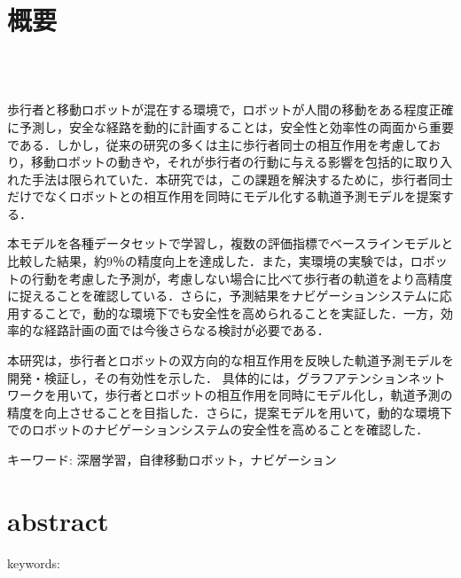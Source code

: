 \chapter*{概要}
\thispagestyle{empty}
%
\begin{center}
  \scalebox{1.5}{移動ロボットのための深層学習を用いた}\\
  \scalebox{1.5}{歩行者の位置予測とナビゲーションへの応用}\\
\end{center}
\vspace{1.0zh}
%

歩行者と移動ロボットが混在する環境で，ロボットが人間の移動をある程度正確に予測し，安全な経路を動的に計画することは，安全性と効率性の両面から重要である．しかし，従来の研究の多くは主に歩行者同士の相互作用を考慮しており，移動ロボットの動きや，それが歩行者の行動に与える影響を包括的に取り入れた手法は限られていた．本研究では，この課題を解決するために，歩行者同士だけでなくロボットとの相互作用を同時にモデル化する軌道予測モデルを提案する．

本モデルを各種データセットで学習し，複数の評価指標でベースラインモデルと比較した結果，約9％の精度向上を達成した．また，実環境の実験では，ロボットの行動を考慮した予測が，考慮しない場合に比べて歩行者の軌道をより高精度に捉えることを確認している．さらに，予測結果をナビゲーションシステムに応用することで，動的な環境下でも安全性を高められることを実証した．一方，効率的な経路計画の面では今後さらなる検討が必要である．

本研究は，歩行者とロボットの双方向的な相互作用を反映した軌道予測モデルを開発・検証し，その有効性を示した．
具体的には，グラフアテンションネットワークを用いて，歩行者とロボットの相互作用を同時にモデル化し，軌道予測の精度を向上させることを目指した．さらに，提案モデルを用いて，動的な環境下でのロボットのナビゲーションシステムの安全性を高めることを確認した．

\vspace{1.0zh}
\begin{flushleft}
キーワード: 深層学習，自律移動ロボット，ナビゲーション
\end{flushleft}
%
\newpage
\chapter*{abstract}
\thispagestyle{empty}
%
\begin{center}
  \scalebox{1.3}{title}
\end{center}
\vspace{1.0zh}
%


keywords:
